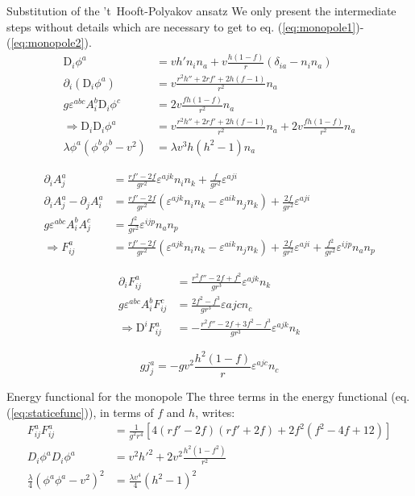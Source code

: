 \begin{section}{Substitution of the 't~Hooft-Polyakov ansatz}\label{sec:detailsmonopole}
  We only present the intermediate steps without details which are
  necessary to get to eq. (\ref{eq:monopole1})-(\ref{eq:monopole2}).
  \begin{align}
    \mathrm{D}_i\phi^a &= vh'n_in_a + v\frac{h(1-f)}{r}(\delta_{ia}-n_in_a)\\
    \partial_i\left(\mathrm D_i\phi^a\right) &= v\frac{r^2h''+2rf'+2h(f-1)}{r^2}n_a\\
    g\varepsilon^{abc}A_i^b\mathrm D_i\phi^c &= 2v\frac{fh(1-f)}{r^2}n_a\\
    \Rightarrow \mathrm D_i\mathrm D_i\phi^a &= v\frac{r^2h''+2rf'+2h(f-1)}{r^2}n_a + 2v\frac{fh(1-f)}{r^2}n_a\\
    \lambda\phi^a(\phi^b\phi^b-v^2) &= \lambda v^3 h (h^2-1) n_a
  \end{align}


  \begin{align}
    \partial_iA_j^a &= \frac{rf'-2f}{gr^2}\varepsilon^{ajk}n_in_k +\frac{f}{gr^2}\varepsilon^{aji}\\
    \partial_iA_j^a-\partial_jA_i^a &= \frac{rf'-2f}{gr^2}(\varepsilon^{ajk}n_in_k-\varepsilon^{aik}n_jn_k) +\frac{2f}{gr^2}\varepsilon^{aji}\\
    g\varepsilon^{abc}A_i^bA_j^c &= \frac{f^2}{gr^2}\varepsilon^{ijp}n_an_p\\
    \Rightarrow F_{ij}^a &= \frac{rf'-2f}{gr^2}(\varepsilon^{ajk}n_in_k-\varepsilon^{aik}n_jn_k) +\frac{2f}{gr^2}\varepsilon^{aji}+\frac{f^2}{gr^2}\varepsilon^{ijp}n_an_p
  \end{align}

  \begin{align}
    \partial_iF_{ij}^a &= \frac{r^2f''-2f+f^2}{gr^3}\varepsilon^{ajk}n_k\\
    g\varepsilon^{abc}A_i^b F_{ij}^c &= \frac{2f^2-f^3}{gr^3}\varepsilon{ajc}n_c\\
    \Rightarrow \mathrm D^iF_{ij}^a &= -\frac{r^2f''-2f+3f^2-f^3}{gr^3}\varepsilon^{ajk}n_k
  \end{align}

  \begin{equation}
    gj_j^a = -gv^2\frac{h^2(1-f)}{r}\varepsilon^{ajc}n_c
  \end{equation}
  
\end{section}

\begin{section}{Energy functional for the monopole}
  The three terms in the energy functional (eq. (\ref{eq:staticefunc})), in terms of $f$ and $h$, writes:
  \begin{align}
    F_{ij}^aF_{ij}^a &= \frac{1}{g^2r^4}\left[4(rf'-2f)(rf'+2f)+2f^2(f^2-4f+12)\right]\\
    D_i\phi^aD_i\phi^a &= v^2h'^2+2v^2\frac{h^2(1-f^2)}{r^2}\\
    \frac{\lambda}{4}(\phi^a\phi^a-v^2)^2 &= \frac{\lambda v^4}{4}(h^2-1)^2
  \end{align}
\end{section}

